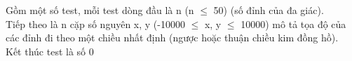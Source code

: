 Gồm một số test, mỗi test dòng đầu là n (n  $\le$  50) (số đỉnh của đa giác).   
\\   Tiếp theo là n cặp số nguyên x, y (-10000  $\le$  x, y  $\le$  10000) mô tả tọa độ của các đỉnh đi theo một chiều nhất định (ngược hoặc thuận chiều kim đồng hồ).   
\\   Kết thúc test là số 0